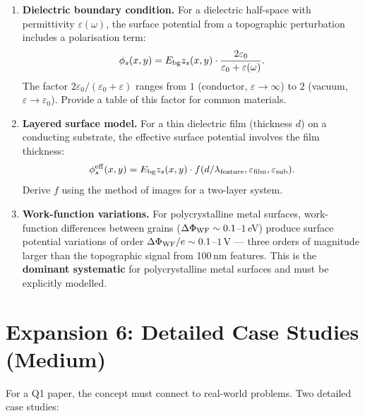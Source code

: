 \documentclass[11pt,a4paper]{article}
\begin{document}
\begin{enumerate}[label=\textbf{D\arabic*}, leftmargin=*]

    \item \textbf{Dielectric boundary condition.}
    For a dielectric half-space with permittivity $\varepsilon(\omega)$, the surface potential from a topographic perturbation includes a polarisation term:
    \begin{equation}
    \phi_s(x,y) = E_{\rm bg}z_s(x,y) \cdot \frac{2\varepsilon_0}{\varepsilon_0 + \varepsilon(\omega)}.
    \end{equation}
    The factor $2\varepsilon_0/(\varepsilon_0 + \varepsilon)$ ranges from $1$ (conductor, $\varepsilon \to \infty$) to $2$ (vacuum, $\varepsilon \to \varepsilon_0$). Provide a table of this factor for common materials.

    \item \textbf{Layered surface model.}
    For a thin dielectric film (thickness $d$) on a conducting substrate, the effective surface potential involves the film thickness:
    \begin{equation}
    \phi_s^{\rm eff}(x,y) = E_{\rm bg}z_s(x,y) \cdot f(d/\lambda_{\rm feature}, \varepsilon_{\rm film}, \varepsilon_{\rm sub}).
    \end{equation}
    Derive $f$ using the method of images for a two-layer system.

    \item \textbf{Work-function variations.}
    For polycrystalline metal surfaces, work-function differences between grains ($\Delta\Phi_{\rm WF} \sim 0.1$--$1$\,eV) produce surface potential variations of order $\Delta\Phi_{\rm WF}/e \sim 0.1$--$1$\,V --- three orders of magnitude larger than the topographic signal from 100\,nm features. This is the \textbf{dominant systematic} for polycrystalline metal surfaces and must be explicitly modelled.

\end{enumerate}

\section{Expansion 6: Detailed Case Studies (Medium)}

For a Q1 paper, the concept must connect to real-world problems. Two detailed case studies:
\end{document}
